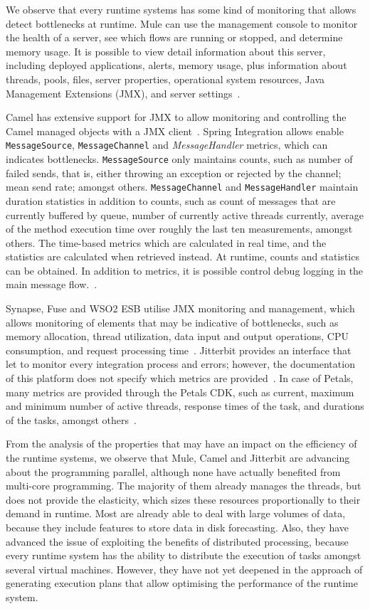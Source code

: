 We observe that every runtime systems has some kind of monitoring that allows detect bottlenecks at runtime. Mule can use the management console to monitor the health of a server, see which flows are running or stopped, and determine memory usage. It is possible to view detail information about this server, including deployed applications, alerts, memory usage, plus information about threads, pools, files, server properties, operational system resources, Java Management Extensions (JMX), and server settings~\cite{Mule}. 

Camel has extensive support for JMX to allow monitoring and controlling the Camel managed objects with a JMX client~\cite{Camel}. Spring Integration allows enable \texttt{MessageSource}, \texttt{MessageChannel} and \textit{MessageHandler} metrics, which can indicates bottlenecks. \texttt{MessageSource} only maintains counts, such as number of failed sends, that is, either throwing an exception or rejected by the channel; mean send rate; amongst others. \texttt{MessageChannel} and \texttt{MessageHandler} maintain duration statistics in addition to counts, such as count of messages that are currently buffered by queue, number of currently active threads currently, average of the method execution time over roughly the last ten measurements, amongst others. The time-based metrics which are calculated in real time, and the statistics are calculated when retrieved instead. At runtime, counts and statistics can be obtained. In addition to metrics, it is possible control debug logging in the main message flow.~\cite{Spring}. 

Synapse, Fuse and WSO2 ESB utilise JMX monitoring and management, which allows monitoring of elements that may be indicative of bottlenecks, such as memory allocation, thread utilization, data input and output operations, CPU consumption, and request processing time~\cite{Snapse,Fuse}. Jitterbit provides an interface that let to monitor every integration process and errors; however, the documentation of this platform does not specify which metrics are provided~\cite{Jitterbit}. In case of Petals, many metrics are provided through the Petals CDK, such as current, maximum and minimum number of active threads, response times of the task, and durations of the tasks, amongst others~\cite{Petals}. 

From the analysis of the properties that may have an impact on the efficiency of the runtime systems, we observe that Mule, Camel and Jitterbit are advancing about the programming parallel, although none have actually benefited from multi-core programming. The majority of them already manages the threads, but does not provide the elasticity, which sizes these resources proportionally to their demand in runtime. Most are already able to deal with large volumes of data, because they include features to store data in disk forecasting. Also, they have advanced the issue of exploiting the benefits of distributed processing, because every runtime system has the ability to distribute the execution of tasks amongst several virtual machines. However, they have not yet deepened in the approach of generating execution plans that allow optimising the performance of the runtime system.

